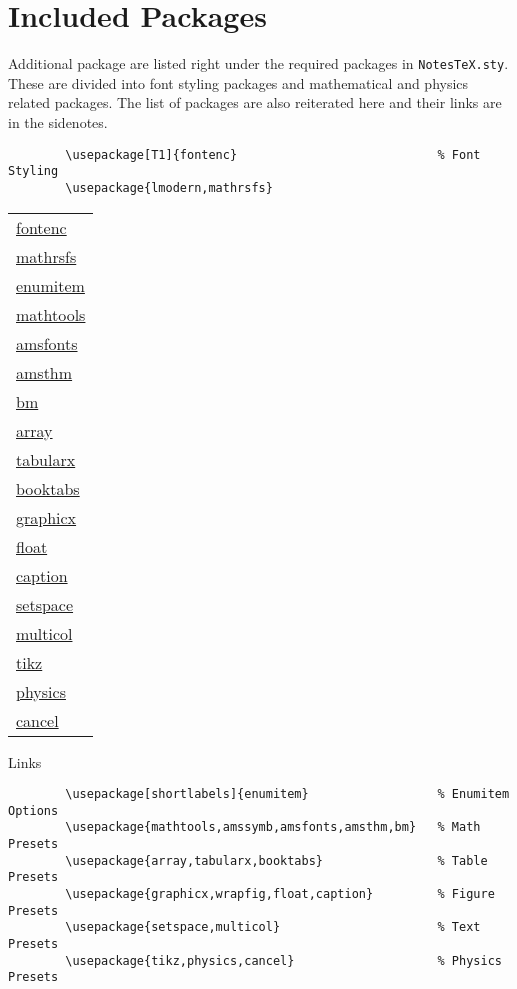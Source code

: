 \documentclass[10pt]{article}
\begin{document}
	\section{Included Packages} %
	\label{sec:incpackage}
	Additional package are listed right under the required packages in \texttt{NotesTeX.sty}. These are divided into font styling packages and mathematical and physics related packages. The list of packages are also reiterated here and their links are in the sidenotes.
	\begin{verbatim}
		\usepackage[T1]{fontenc}                            % Font Styling
		\usepackage{lmodern,mathrsfs}
	\end{verbatim}
	\begin{margintable}\footnotesize 
		\begin{tabularx}{\marginparwidth}{|X}
			\href{https://www.ctan.org/pkg/fontenc}{fontenc}\\
			\href{https://www.ctan.org/pkg/mathrsfs}{mathrsfs}\\
			\href{https://www.ctan.org/pkg/enumitem}{enumitem}\\
			\href{https://www.ctan.org/pkg/mathtools}{mathtools}\\
			\href{https://www.ctan.org/pkg/amsfonts}{amsfonts}\\
			\href{https://www.ctan.org/pkg/amsthm}{amsthm}\\
			\href{https://www.ctan.org/pkg/bm}{bm}\\
			\href{https://www.ctan.org/pkg/array}{array}\\
			\href{https://www.ctan.org/pkg/tabularx}{tabularx}\\
			\href{https://www.ctan.org/pkg/booktabs}{booktabs}\\
			\href{https://www.ctan.org/pkg/graphicx}{graphicx}\\
			\href{https://www.ctan.org/pkg/float}{float}\\
			\href{https://www.ctan.org/pkg/caption}{caption}\\
			\href{https://www.ctan.org/pkg/setspace}{setspace}\\
			\href{https://www.ctan.org/pkg/multicol}{multicol}\\
			\href{https://www.ctan.org/topic/pgf-tikz}{tikz}\\
			\href{https://www.ctan.org/pkg/physics}{physics}\\
			\href{https://www.ctan.org/pkg/cancel}{cancel}
		\end{tabularx}
		\caption{Links}
	\end{margintable}
	\begin{verbatim}
		\usepackage[shortlabels]{enumitem}                  % Enumitem Options
		\usepackage{mathtools,amssymb,amsfonts,amsthm,bm}   % Math Presets
		\usepackage{array,tabularx,booktabs}                % Table Presets
		\usepackage{graphicx,wrapfig,float,caption}         % Figure Presets
		\usepackage{setspace,multicol}                      % Text Presets
		\usepackage{tikz,physics,cancel}                    % Physics Presets
	\end{verbatim}
\end{document}
